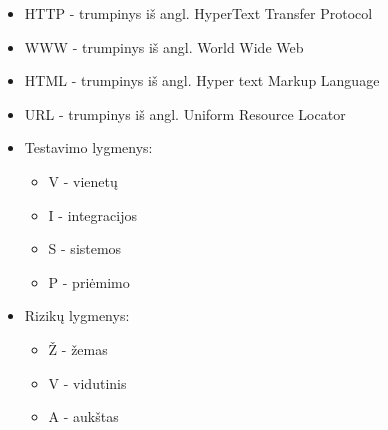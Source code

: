 \documentclass{VUMIFPSkursinis}
\begin{document}
    \begin{itemize}
    	\item HTTP - trumpinys iš angl. HyperText Transfer Protocol
    	\item WWW - trumpinys iš angl. World Wide Web
    	\item HTML - trumpinys iš angl. Hyper text Markup Language
    	\item URL - trumpinys iš angl. Uniform Resource Locator
    	\item Testavimo lygmenys:
    		\begin{itemize}
    			\item V - vienetų
    			\item I - integracijos
    			\item S - sistemos
    			\item P - priėmimo
    		\end{itemize}
    	\item Rizikų lygmenys:
    		\begin{itemize}
    			\item Ž - žemas
    			\item V - vidutinis
    			\item A - aukštas
    		\end{itemize}
    \end{itemize}

  
\end{document}

